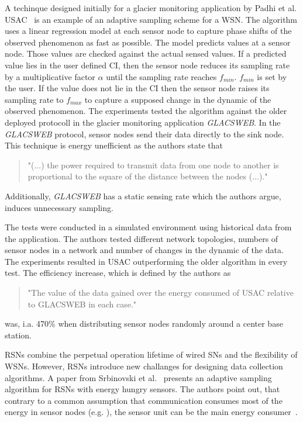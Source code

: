 A techinque designed initially for a glacier monitoring application by Padhi et
al. \ac{USAC}~\cite{padhy2006utility} is an example of an adaptive sampling
scheme for a \ac{WSN}. The algorithm uses a linear regression model at each
sensor node to capture phase shifts of the observed phenomenon as fast as
possible. The model predicts values at a sensor node. Those values are checked
against the actual sensed values. If a predicted value lies in the user defined
\ac{CI}, then the sensor node reduces its sampling rate by a multiplicative
factor $ \alpha $ until the sampling rate reaches $ f_{min} $. $ f_{min} $ is
set by the user. If the value does not lie in the \ac{CI} then the sensor node
raises its sampling rate to $ f_{max} $ to capture a supposed change in the
dynamic of the observed phenomenon. The experiments tested the algorithm
against the older deployed protocoll in the glacier monitoring application
\textit{GLACSWEB}. In the \textit{GLACSWEB} protocol, sensor nodes send their
data directly to the sink node. This technique is energy unefficient as the
authors state that 

\begin{quotation}
    "(...) the power required to transmit data from one
    node to another is proportional to the square of the distance
    between the nodes (...)."
\end{quotation}

Additionally, \textit{GLACSWEB} has a static sensing rate which the authors
argue, induces unnecessary sampling.

The tests were conducted in a simulated environment using
historical data from the application. The authors tested different network
topologies, numbers of sensor nodes in a network and number of changes in the
dynamic of the data. The experiments resulted in \ac{USAC} outperforming the
older algorithm in every test. The efficiency increase, which is defined by the
authors as

\begin{quotation}
    "The value of the data gained over the energy consumed of USAC relative to
    GLACSWEB in each case."
\end{quotation}


was, i.a. 470\% when distributing sensor nodes randomly around a center base
station.
\par

\acp{RSN} combine the perpetual operation lifetime of wired \acp{SN} and the
flexibility of \acp{WSN}. However, \acp{RSN} introduce new challanges for
designing data collection algorithms. A paper from Srbinovski et
al.~\cite{srbinovski2016energy} presents an adaptive sampling algorithm for
\acp{RSN} with energy hungry sensors. The authors point out, that contrary to a
common assumption that communication consumes most of the energy in sensor
nodes (e.g. \cite{santini200communication}), the sensor unit can be the main
energy consumer~\cite{boyle2012energy}. 


